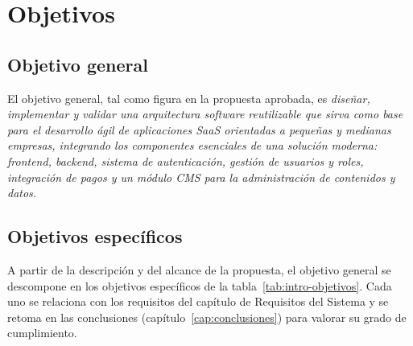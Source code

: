 \section{Objetivos}
\label{sec:intro-objetivos}

\subsection{Objetivo general}

El objetivo general, tal como figura en la propuesta aprobada, es
\emph{diseñar, implementar y validar una arquitectura software reutilizable
que sirva como base para el desarrollo ágil de aplicaciones SaaS orientadas a
pequeñas y medianas empresas, integrando los componentes esenciales de una
solución moderna: \textit{frontend}, \textit{backend}, sistema de
autenticación, gestión de usuarios y roles, integración de pagos y un módulo
CMS para la administración de contenidos y datos.}

\subsection{Objetivos específicos}

A partir de la descripción y del alcance de la propuesta, el objetivo general
se descompone en los objetivos específicos de la
tabla~\ref{tab:intro-objetivos}. Cada uno se relaciona con los requisitos del
capítulo de Requisitos del Sistema y se retoma en las conclusiones
(capítulo~\ref{cap:conclusiones}) para valorar su grado de cumplimiento.

